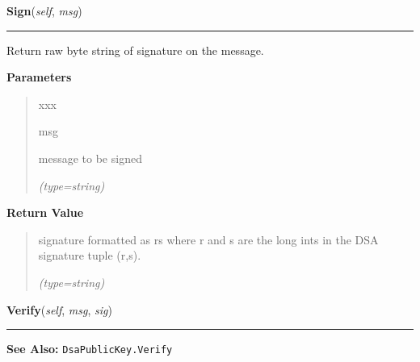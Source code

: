 \hspace{.8\funcindent}\begin{boxedminipage}{\funcwidth}

    \raggedright \textbf{Sign}(\textit{self}, \textit{msg})

    \vspace{-1.5ex}

    \rule{\textwidth}{0.5\fboxrule}
\setlength{\parskip}{2ex}
    Return raw byte string of signature on the message.

\setlength{\parskip}{1ex}
      \textbf{Parameters}
      \vspace{-1ex}

      \begin{quote}
        \begin{Ventry}{xxx}

          \item[msg]

          message to be signed

            {\it (type=string)}

        \end{Ventry}

      \end{quote}

      \textbf{Return Value}
    \vspace{-1ex}

      \begin{quote}
      signature formatted as r{\textbar}s where r and s are the long ints 
      in the DSA signature tuple (r,s).

      {\it (type=string)}

      \end{quote}

    \end{boxedminipage}

    \label{keyczar:keys:DsaPrivateKey:Verify}

    \vspace{0.5ex}

\hspace{.8\funcindent}\begin{boxedminipage}{\funcwidth}

    \raggedright \textbf{Verify}(\textit{self}, \textit{msg}, \textit{sig})

    \vspace{-1.5ex}

    \rule{\textwidth}{0.5\fboxrule}
\setlength{\parskip}{2ex}
\setlength{\parskip}{1ex}
\textbf{See Also:} \texttt{DsaPublicKey.Verify}



    \end{boxedminipage}


